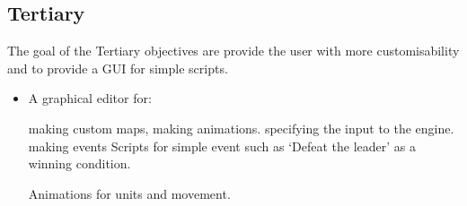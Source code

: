 \subsection{Tertiary} 
\label{tertiary}
The goal of the Tertiary objectives are provide the user with more customisability and to provide a GUI for simple scripts. 

\begin{itemize}
	\cross Custom events
	\begin{itemize}
		\item Attached to units or titles, could be used for:
		\begin{itemize}
			\item Making the player win if some enemies unit has less then 50\% Hit Points.
			
			\item Damaging a character if step on a specified.
			
			\item Showing some part of the story when a player's character reach a specified tile.
		\end{itemize}
	\end{itemize}
	
	\item A graphical editor for:
	\begin{itemize}
		\tick   making custom maps,
		\tick   making animations.
		\cross  specifying the input to the engine.
		\cross  making events
		\cross  Scripts for simple event such as `Defeat the leader' as a winning condition.
	\end{itemize}
	
	\tick Animations for units and movement.
\end{itemize}